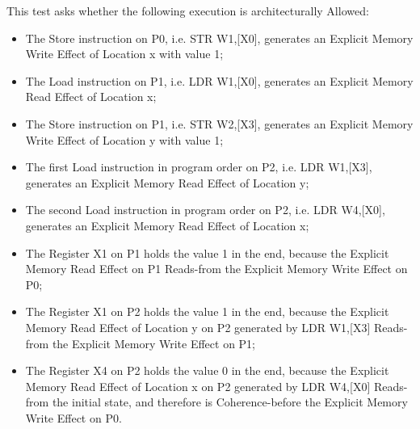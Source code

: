 This test asks whether the following execution is architecturally Allowed:

\begin{itemize}
  \item The Store instruction on P0, i.e. STR W1,[X0], generates an Explicit Memory Write Effect of Location x with value 1;
  \item The Load instruction on P1, i.e. LDR W1,[X0], generates an Explicit Memory Read Effect of Location x;
  \item The Store instruction on P1, i.e. STR W2,[X3], generates an Explicit Memory Write Effect of Location y with value 1;
  \item The first Load instruction in program order on P2, i.e. LDR W1,[X3], generates an Explicit Memory Read Effect of Location y;
  \item The second Load instruction in program order on P2, i.e. LDR W4,[X0], generates an Explicit Memory Read Effect of Location x;
  \item The Register X1 on P1 holds the value 1 in the end, because the Explicit Memory Read Effect on P1 Reads-from the Explicit Memory Write Effect on P0;
  \item The Register X1 on P2 holds the value 1 in the end, because the Explicit Memory Read Effect of Location y on P2 generated by LDR W1,[X3] Reads-from the Explicit Memory Write Effect on P1;
  \item The Register X4 on P2 holds the value 0 in the end, because the Explicit Memory Read Effect of Location x on P2 generated by LDR W4,[X0] Reads-from the initial state, and therefore is Coherence-before the Explicit Memory Write Effect on P0.
\end{itemize}
